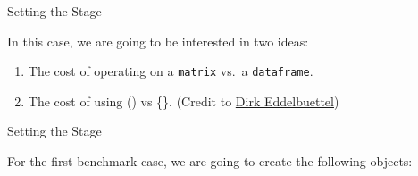 \begin{frame}[fragile]{Setting the Stage}

In this case, we are going to be interested in two ideas:

\begin{enumerate}
\def\labelenumi{\arabic{enumi}.}
\tightlist
\item
  The cost of operating on a \texttt{matrix} vs.~a \texttt{dataframe}.
\item
  The cost of using () vs \{\}. (Credit to
  \href{http://dirk.eddelbuettel.com/blog/2011/04/12/}{Dirk
  Eddelbuettel})
\end{enumerate}

\end{frame}

\begin{frame}[fragile]{Setting the Stage}

For the first benchmark case, we are going to create the following
objects:

\begin{Shaded}
\begin{Highlighting}[]
\NormalTok{(}\NormalTok{)}

\StringTok{ }\NormalTok{(}\NormalTok{(}\NormalTok{*}\NormalTok{), }\NormalTok{, }\NormalTok{)}

\StringTok{ }
\end{Highlighting}
\end{Shaded}

\end{frame}

